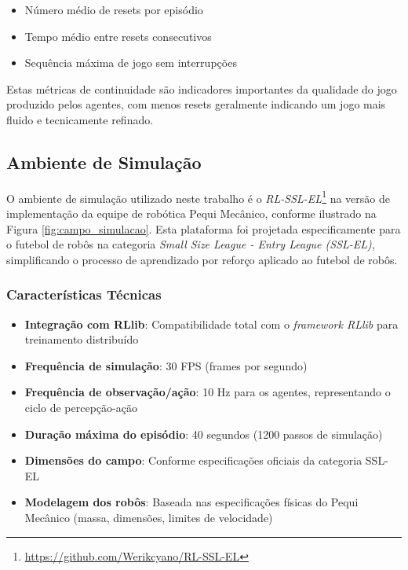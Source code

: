 \begin{itemize}
    \item Número médio de resets por episódio
    \item Tempo médio entre resets consecutivos
    \item Sequência máxima de jogo sem interrupções
\end{itemize}

Estas métricas de continuidade são indicadores importantes da qualidade do jogo produzido pelos agentes, com menos resets geralmente indicando um jogo mais fluido e tecnicamente refinado.

\subsection{Ambiente de Simulação}

O ambiente de simulação utilizado neste trabalho é o \textit{RL-SSL-EL}\footnote{\url{https://github.com/Werikcyano/RL-SSL-EL}} na versão de implementação da equipe de robótica Pequi Mecânico, conforme ilustrado na Figura \ref{fig:campo_simulacao}. Esta plataforma foi projetada especificamente para o futebol de robôs na categoria \textit{Small Size League - Entry League (SSL-EL)}, simplificando o processo de aprendizado por reforço aplicado ao futebol de robôs.

\subsubsection{Características Técnicas}

\begin{itemize}
    \item \textbf{Integração com RLlib}: Compatibilidade total com o \textit{framework RLlib} para treinamento distribuído
    \item \textbf{Frequência de simulação}: 30 FPS (frames por segundo)
    \item \textbf{Frequência de observação/ação}: 10 Hz para os agentes, representando o ciclo de percepção-ação
    \item \textbf{Duração máxima do episódio}: 40 segundos (1200 passos de simulação)
    \item \textbf{Dimensões do campo}: Conforme especificações oficiais da categoria SSL-EL
    \item \textbf{Modelagem dos robôs}: Baseada nas especificações físicas do Pequi Mecânico (massa, dimensões, limites de velocidade)
\end{itemize}

